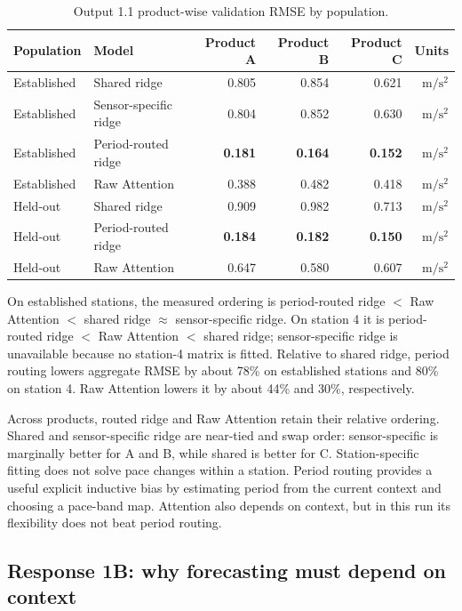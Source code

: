 \documentclass[11pt,a4paper]{article}
\newcommand{\units}{\ensuremath{\mathrm{m/s^2}}}
\begin{document}
\begin{table}[H]
\centering
\caption{Output 1.1 product-wise validation RMSE by population.}
\label{tab:part1-products}
\small
\begin{tabular}{llrrrr}
\toprule
Population & Model & Product A & Product B & Product C & Units\\
\midrule
Established & Shared ridge & 0.805 & 0.854 & 0.621 & \units\\
Established & Sensor-specific ridge & 0.804 & 0.852 & 0.630 & \units\\
Established & Period-routed ridge & \textbf{0.181} & \textbf{0.164} & \textbf{0.152} & \units\\
Established & Raw Attention & 0.388 & 0.482 & 0.418 & \units\\
Held-out & Shared ridge & 0.909 & 0.982 & 0.713 & \units\\
Held-out & Period-routed ridge & \textbf{0.184} & \textbf{0.182} & \textbf{0.150} & \units\\
Held-out & Raw Attention & 0.647 & 0.580 & 0.607 & \units\\
\bottomrule
\end{tabular}
\end{table}

On established stations, the measured ordering is period-routed ridge $<$ Raw Attention $<$
shared ridge $\approx$ sensor-specific ridge. On station 4 it is period-routed ridge $<$
Raw Attention $<$ shared ridge; sensor-specific ridge is unavailable because no station-4
matrix is fitted. Relative to shared ridge, period routing lowers aggregate RMSE by about 78\%
on established stations and 80\% on station 4. Raw Attention lowers it by about 44\% and 30\%,
respectively.

Across products, routed ridge and Raw Attention retain their relative ordering. Shared and
sensor-specific ridge are near-tied and swap order: sensor-specific is marginally better for A
and B, while shared is better for C. Station-specific fitting does not solve pace changes within
a station. Period routing provides a useful explicit inductive bias by estimating period from
the current context and choosing a pace-band map. Attention also depends on context, but in this
run its flexibility does not beat period routing.

\subsection{Response 1B: why forecasting must depend on context}
\end{document}

